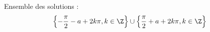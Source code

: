 Ensemble des solutions :
\begin{displaymath}
  \left\lbrace -\frac{\pi}{2} - a +2k\pi, k\in \Z\right\rbrace \cup  \left\lbrace \frac{\pi}{2} + a +2k\pi, k\in \Z\right\rbrace
\end{displaymath}

